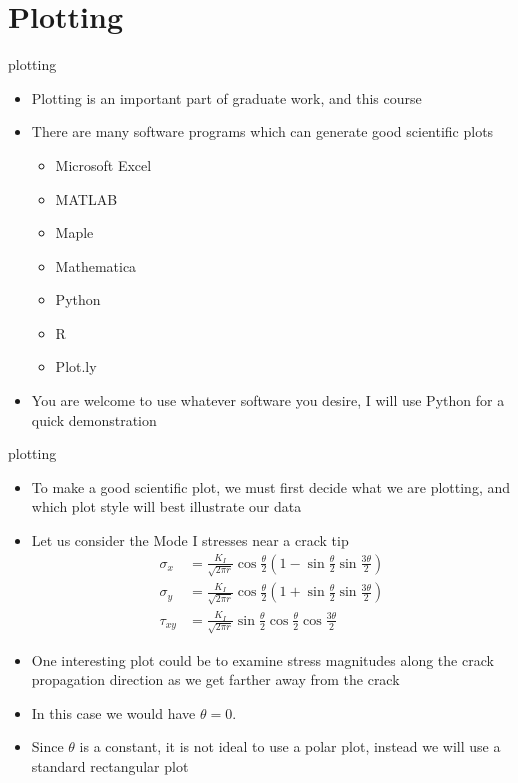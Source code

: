 \documentclass[10pt]{beamer}
\begin{document}
\section{Plotting}

\begin{frame}{plotting}
	\begin{itemize}
		\item Plotting is an important part of graduate work, and this course
		\item There are many software programs which can generate good scientific plots
		\begin{itemize}
			\item Microsoft Excel
			\item MATLAB
			\item Maple
			\item Mathematica
			\item Python
			\item R
			\item Plot.ly
		\end{itemize}
		\item You are welcome to use whatever software you desire, I will use Python for a quick demonstration
	\end{itemize}
\end{frame}

\begin{frame}{plotting}
	\begin{itemize}
		\item To make a good scientific plot, we must first decide what we are plotting, and which plot style will best illustrate our data
		\item Let us consider the Mode I stresses near a crack tip
		\begin{align*}
		\sigma_x &= \frac{K_I}{\sqrt{2\pi r}} \cos \frac{\theta}{2} \left(1-\sin \frac{\theta}{2}\sin \frac{3\theta}{2}\right)\\
		\sigma_y &= \frac{K_I}{\sqrt{2\pi r}} \cos \frac{\theta}{2} \left(1+\sin \frac{\theta}{2}\sin \frac{3\theta}{2}\right)\\
		\tau_{xy} &= \frac{K_I}{\sqrt{2\pi r}} \sin \frac{\theta}{2} \cos \frac{\theta}{2}\cos \frac{3\theta}{2}
		\end{align*}
		\item One interesting plot could be to examine stress magnitudes along the crack propagation direction as we get farther away from the crack
		\item In this case we would have $\theta = 0$.
		\item Since $\theta$ is a constant, it is not ideal to use a polar plot, instead we will use a standard rectangular plot
	\end{itemize}
\end{frame}
\end{document}
